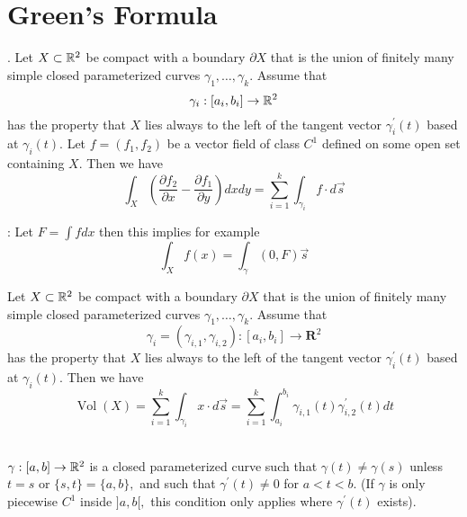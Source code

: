 \section{Green's Formula}

\Theorem [Green]. Let $X \subset \mathbb{R}^{2}$ be compact with a boundary $\partial X$ that is the union of finitely many simple closed parameterized curves $\gamma_{1}, \ldots, \gamma_{k} .$ Assume that
$$
\gamma_{i}:\left[a_{i}, b_{i}\right] \rightarrow \mathbb{R}^{2}
$$
has the property that $X$ lies always to the left of the tangent vector $\gamma_{i}^{\prime}(t)$ based at $\gamma_{i}(t)$. Let $f=\left(f_{1}, f_{2}\right)$ be a vector field of class $C^{1}$ defined on some open set containing $X .$ Then we have
$$
\int_{X}\left(\frac{\partial f_{2}}{\partial x}-\frac{\partial f_{1}}{\partial y}\right) d x d y=\sum_{i=1}^{k} \int_{\gamma_{i}} f \cdot d \vec{s}
$$

: Let $F = \int f dx$ then this implies for example
$$\int_{X} f(x) = \int_{\gamma} (0, F)\vec{s}$$

\Corollary [4.6.5] Let $X \subset \mathbb{R}^{2}$ be compact with a boundary $\partial X$ that is the union of finitely many simple closed parameterized curves $\gamma_{1}, \ldots, \gamma_{k} .$ Assume that
$$
\gamma_{i}=\left(\gamma_{i, 1}, \gamma_{i, 2}\right):\left[a_{i}, b_{i}\right] \rightarrow \mathbf{R}^{2}
$$
has the property that $X$ lies always to the left of the tangent vector $\gamma_{i}^{\prime}(t)$ based at $\gamma_{i}(t)$. Then we have
$$
\operatorname{Vol}(X)=\sum_{i=1}^{k} \int_{\gamma_{i}} x \cdot d \vec{s}=\sum_{i=1}^{k} \int_{a_{i}}^{b_{i}} \gamma_{i, 1}(t) \gamma_{i, 2}^{\prime}(t) d t
$$

 \\$\gamma:[a, b] \rightarrow \mathbb{R}^{2}$ is a closed parameterized curve such that $\gamma(t) \neq \gamma(s)$ unless $t=s$ or $\{s, t\}=\{a, b\},$ and such that $\gamma^{\prime}(t) \neq 0$ for $a<t<b .$ (If $\gamma$ is only piecewise $C^{1}$ inside $] a, b[,$ this condition only applies where $\gamma^{\prime}(t)$ exists).



\begin{comment}
	
\end{comment}